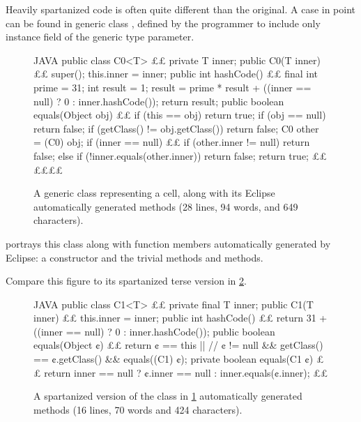 Heavily spartanized code is often quite different than the original. A case in
point can be found in generic class , defined by the programmer to
include only instance field  of the generic type parameter.

\begin{figure}
  \caption{\label{figure:cell0}%
    A generic class representing a cell, along with its Eclipse
  automatically generated methods (28 lines, 94 words, and 649 characters).}
    \begin{adjustbox}{max width=\columnwidth}
\begin{code}[minipage, width=1.25\columnwidth]{JAVA}
public class C0<T> {££
  private T inner;
  public C0(T inner) {££
    super();
    this.inner = inner;
  }
  public int hashCode() {££
    final int prime = 31;
    int result = 1;
    result = prime * result + ((inner == null) ? 0 : inner.hashCode());
    return result;
  }
  public boolean equals(Object obj) {££
    if (this == obj)
      return true;
    if (obj == null)
      return false;
    if (getClass() != obj.getClass())
      return false;
    C0 other = (C0) obj;
    if (inner == null) {££
      if (other.inner != null)
        return false;
    } else if (!inner.equals(other.inner))
      return false;
    return true;
  }££
}££££
\end{code}
\end{adjustbox}
\end{figure}

 portrays this class along with function members
automatically generated by Eclipse: a constructor and the trivial methods
 and  methods.

Compare this figure to its spartanized terse version in \cref{figure:cell1}.

\begin{figure}
  \caption{\label{figure:cell1}%
    A spartanized version of the \Java class in \cref{figure:cell0}
    automatically generated methods (16 lines, 70 words and 424 characters).}
    \begin{adjustbox}{max width=\columnwidth}
\begin{code}[minipage, width=1.25\columnwidth]{JAVA}
public class C1<T> {££
  private final T inner;
  public C1(T inner) {££
    this.inner = inner;
  }
  public int hashCode() {££
    return 31 + ((inner == null) ? 0 : inner.hashCode());
  }
  public boolean equals(Object ¢) {££
    return ¢ == this || //
      ¢ != null && getClass() == ¢.getClass() && equals((C1) ¢);
  }
  private boolean equals(C1 ¢) {££
    return inner == null ? ¢.inner == null : inner.equals(¢.inner);
  }££
}
\end{code}
\end{adjustbox}
\end{figure}

